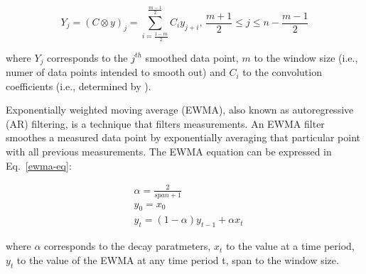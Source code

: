 \begin{equation}\label{sg-eq}
    Y_j=(C\otimes y)_j=\sum_{i=\frac{1-m}{2}}^{\frac{m-1}{2}}C_iy_{j+i},\,\frac{m+1}{2}\le j\le n-\frac{m-1}{2}
\end{equation}

\noindent
where $Y_j$ corresponds to the $j^{th}$ smoothed data point, $m$ to the window size (i.e., numer of data points intended to smooth out) and $C_i$ to the convolution coefficients (i.e., determined by \citet{savitzkySmoothingDifferentiationData1964}). 

Exponentially weighted moving average (EWMA), also known as autoregressive (AR) filtering, is a technique that filters measurements. An EWMA filter smoothes a measured data point by exponentially averaging that particular point with all previous measurements. The EWMA equation can be expressed in Eq.~\ref{ewma-eq}:

\begin{equation}\label{ewma-eq}
    \begin{aligned}
        &\alpha=\frac{2}{span+1} \\
        &y_0=x_0 \\
        &y_t=(1-\alpha)y_{t-1}+\alpha x_t
    \end{aligned}
\end{equation}

\noindent
where $\alpha$ corresponds to the decay paratmeters, $x_t$ to the value at a time period, $y_t$ to the value of the EWMA at any time period t, span to the window size.

